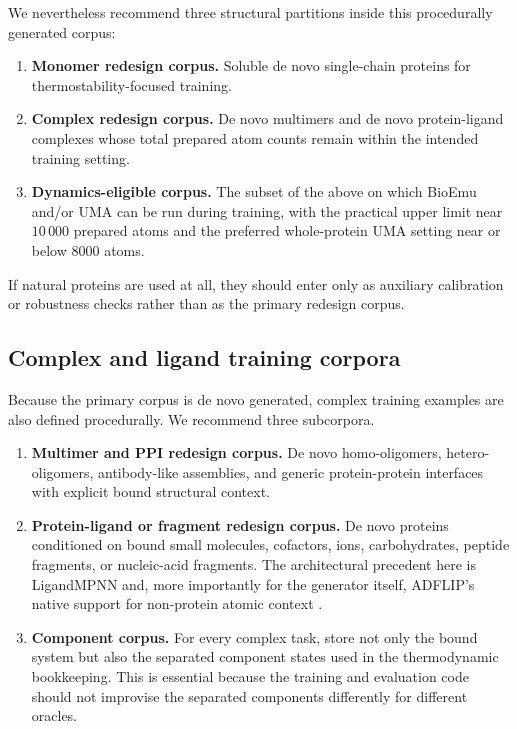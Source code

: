 \documentclass[11pt]{article}
\begin{document}
We nevertheless recommend three structural partitions inside this procedurally generated corpus:
\begin{enumerate}[leftmargin=1.5em]
    \item \textbf{Monomer redesign corpus.} Soluble de novo single-chain proteins for thermostability-focused training.
    \item \textbf{Complex redesign corpus.} De novo multimers and de novo protein-ligand complexes whose total prepared atom counts remain within the intended training setting.
    \item \textbf{Dynamics-eligible corpus.} The subset of the above on which BioEmu and/or UMA can be run during training, with the practical upper limit near $10\,000$ prepared atoms and the preferred whole-protein UMA setting near or below $8000$ atoms.
\end{enumerate}
If natural proteins are used at all, they should enter only as auxiliary calibration or robustness checks rather than as the primary redesign corpus.



\subsection{Complex and ligand training corpora}

Because the primary corpus is de novo generated, complex training examples are also defined procedurally. We recommend three subcorpora.
\begin{enumerate}[leftmargin=1.5em]
    \item \textbf{Multimer and PPI redesign corpus.} De novo homo-oligomers, hetero-oligomers, antibody-like assemblies, and generic protein-protein interfaces with explicit bound structural context.
    \item \textbf{Protein-ligand or fragment redesign corpus.} De novo proteins conditioned on bound small molecules, cofactors, ions, carbohydrates, peptide fragments, or nucleic-acid fragments. The architectural precedent here is LigandMPNN and, more importantly for the generator itself, ADFLIP's native support for non-protein atomic context \citep{dauparas2025ligandmpnn,yi2025adflip}.
    \item \textbf{Component corpus.} For every complex task, store not only the bound system but also the separated component states used in the thermodynamic bookkeeping. This is essential because the training and evaluation code should not improvise the separated components differently for different oracles.
\end{enumerate}
\end{document}
